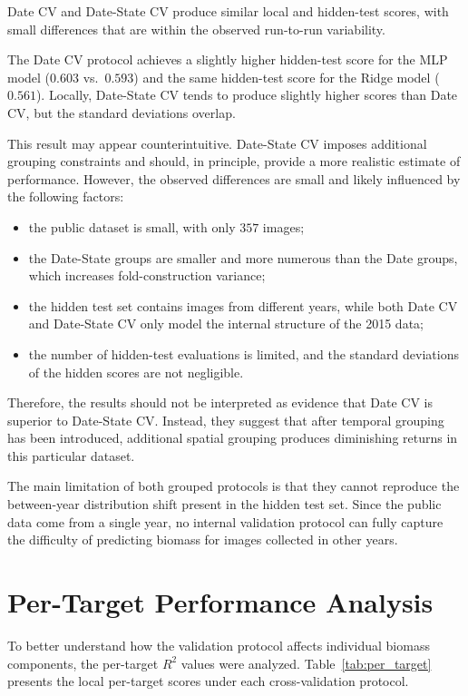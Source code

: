 Date CV and Date-State CV produce similar local and hidden-test scores, with small differences that are within the observed run-to-run variability.

The Date CV protocol achieves a slightly higher hidden-test score for the MLP model ($0.603$ vs.\ $0.593$) and the same hidden-test score for the Ridge model ($0.561$). Locally, Date-State CV tends to produce slightly higher scores than Date CV, but the standard deviations overlap.

This result may appear counterintuitive. Date-State CV imposes additional grouping constraints and should, in principle, provide a more realistic estimate of performance. However, the observed differences are small and likely influenced by the following factors:

\begin{itemize}
    \item the public dataset is small, with only $357$ images;
    \item the Date-State groups are smaller and more numerous than the Date groups, which increases fold-construction variance;
    \item the hidden test set contains images from different years, while both Date CV and Date-State CV only model the internal structure of the 2015 data;
    \item the number of hidden-test evaluations is limited, and the standard deviations of the hidden scores are not negligible.
\end{itemize}

Therefore, the results should not be interpreted as evidence that Date CV is superior to Date-State CV. Instead, they suggest that after temporal grouping has been introduced, additional spatial grouping produces diminishing returns in this particular dataset.

The main limitation of both grouped protocols is that they cannot reproduce the between-year distribution shift present in the hidden test set. Since the public data come from a single year, no internal validation protocol can fully capture the difficulty of predicting biomass for images collected in other years.

\section{Per-Target Performance Analysis}

To better understand how the validation protocol affects individual biomass components, the per-target $R^2$ values were analyzed. Table~\ref{tab:per_target} presents the local per-target scores under each cross-validation protocol.


